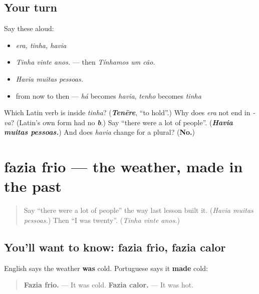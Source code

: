 \subsection*{Your turn}
Say these aloud:

\begin{itemize}
\raggedright
  \item \emph{era, tinha, havia}
  \item \emph{Tinha vinte anos.} — then \emph{Tínhamos um cão.}
  \item \emph{Havia muitas pessoas.}
  \item from now to then — \emph{há} becomes \emph{havia}, \emph{tenho} becomes \emph{tinha}
\end{itemize}

\begin{tcolorbox}[breakable,colback=teal!4,colframe=teal!35!black,title={Before you move on}]
Which Latin verb is inside \emph{tinha}? (\emph{\textbf{Tenēre}}, \textquotedblleft{}to hold\textquotedblright{}.) Why does \emph{era} not end in \emph{-va}? (Latin's own form had no \emph{\textbf{b}}.) Say \textquotedblleft{}there were a lot of people\textquotedblright{}. (\emph{\textbf{Havia muitas pessoas.}}) And does \emph{havia} change for a plural? (\textbf{No.})
\end{tcolorbox}
\section[fazia frio, fazia calor]{fazia frio — the weather, made in the past}

\label{lesson:PT-C259-fazia-frio}



\begin{quote}
Say \textquotedblleft{}there were a lot of people\textquotedblright{} the way last lesson built it. (\emph{Havia muitas pessoas.}) Then \textquotedblleft{}I was twenty\textquotedblright{}. (\emph{Tinha vinte anos.})
\end{quote}

\subsection*{You'll want to know: fazia frio, fazia calor}
English says the weather \textbf{was} cold. Portuguese says it \textbf{made} cold:

\begin{quote}
\textbf{Fazia frio.} — It was cold. \textbf{Fazia calor.} — It was hot.
\end{quote}

